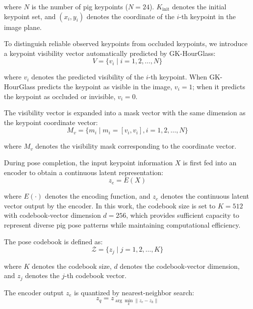 \documentclass[runningheads]{llncs}
\begin{document}
where $N$ is the number of pig keypoints ($N = 24$). $K_{\text{init}}$ denotes the initial keypoint set, and $(x_i, y_i)$ denotes the coordinate of the $i$-th keypoint in the image plane.

To distinguish reliable observed keypoints from occluded keypoints, we introduce a keypoint visibility vector automatically predicted by GK-HourGlass:
\begin{equation}
V = \{v_i \mid i = 1, 2, \ldots, N\}
\label{eq:visibility}
\end{equation}

where $v_i$ denotes the predicted visibility of the $i$-th keypoint. When GK-HourGlass predicts the keypoint as visible in the image, $v_i = 1$; when it predicts the keypoint as occluded or invisible, $v_i = 0$.

The visibility vector is expanded into a mask vector with the same dimension as the keypoint coordinate vector:
\begin{equation}
M_v = \{m_i \mid m_i = [v_i, v_i], i = 1, 2, \ldots, N\}
\label{eq:mask}
\end{equation}

where $M_v$ denotes the visibility mask corresponding to the coordinate vector.

During pose completion, the input keypoint information $X$ is first fed into an encoder to obtain a continuous latent representation:
\begin{equation}
z_e = E(X)
\label{eq:encoder}
\end{equation}

where $E(\cdot)$ denotes the encoding function, and $z_e$ denotes the continuous latent vector output by the encoder. In this work, the codebook size is set to $K = 512$ with codebook-vector dimension $d = 256$, which provides sufficient capacity to represent diverse pig pose patterns while maintaining computational efficiency.

The pose codebook is defined as:
\begin{equation}
\mathcal{Z} = \{z_j \mid j = 1, 2, \ldots, K\}
\label{eq:codebook}
\end{equation}

where $K$ denotes the codebook size, $d$ denotes the codebook-vector dimension, and $z_j$ denotes the $j$-th codebook vector.

The encoder output $z_e$ is quantized by nearest-neighbor search:
\begin{equation}
z_q = z_{\arg\min_k \|z_e - z_k\|}
\label{eq:vq}
\end{equation}
\end{document}
